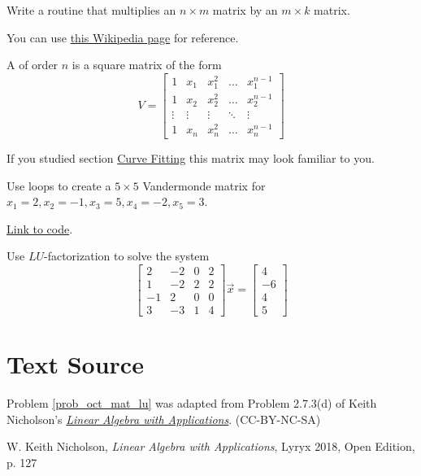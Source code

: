 \documentclass{ximera}
\begin{document}
\begin{problem}\label{prob_oct_6}
    Write a routine that multiplies an $n\times m$ matrix by an $m\times k$ matrix.  

    \begin{hint}
        You can use \href{https://en.wikipedia.org/wiki/Matrix_multiplication_algorithm}{this Wikipedia page} for reference.
    \end{hint}    
\end{problem}

\begin{problem}\label{prob_oct_mat_vandermonde}
    A  of order $n$ is a square matrix of the form 
        $$V=\begin{bmatrix}
    1&x_1&x_1^2&\dots&x_1^{n-1}\\
    1&x_2&x_2^2&\dots&x_2^{n-1}\\
    \vdots&\vdots&\vdots&\ddots&\vdots\\
    1&x_n&x_n^2&\dots&x_n^{n-1}\end{bmatrix}$$  

    If you studied section \href{https://ximera.osu.edu/linearalgebradzv3/LinearAlgebraInteractiveIntro/APP-0070/main}{Curve Fitting} this matrix may look familiar to you. 

    Use loops to create a $5\times 5$ Vandermonde matrix for $x_1=2, x_2=-1, x_3=5, x_4=-2, x_5=3$.

    \begin{hint}
        \href{https://sagecell.sagemath.org/?z=eJxFjEEKgzAURPeB3GE2goIKsWRTcdcjFDdiJeiXRjQpMdQcv7Fd9A08GAYmwY1mbQgKbxq9dejCIHKUZZkjDLLn7Gi6CoWARFHh0tecnUlwf-odhnZPE1ZrXxgdKU97vJJBolVmIrfZaGzKOx04m-O_bsRVcobIWZd_PWlTnS9Zc6Q6e6RLIbL6t5GZOPuq_QBP6C9I&lang=octave&interacts=eJyLjgUAARUAuQ==}{Link to code}.
    \end{hint}
\end{problem}

\begin{problem}\label{prob_oct_mat_lu}
    Use $LU$-factorization to solve the system
    $$\begin{bmatrix}2 &-2&0&2\\1&-2&2&2\\-1&2&0&0\\3&-3&1&4\end{bmatrix}\vec{x}=\begin{bmatrix}4\\-6\\4\\5\end{bmatrix}$$
\end{problem}

\section*{Text Source} Problem \ref{prob_oct_mat_lu} was adapted from Problem 2.7.3(d) of Keith Nicholson's \href{https://open.umn.edu/opentextbooks/textbooks/linear-algebra-with-applications}{\it Linear Algebra with Applications}. (CC-BY-NC-SA)

W. Keith Nicholson, {\it Linear Algebra with Applications}, Lyryx 2018, Open Edition, p. 127 
\end{document}
